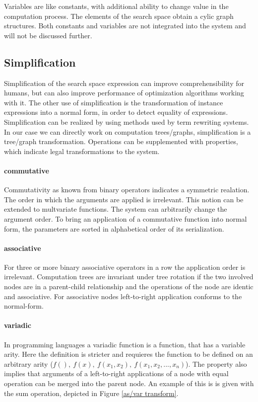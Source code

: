 \documentclass[english]{article}
\begin{document}
Variables are like constants, with additional ability to change value in the computation process. The elements of the search space obtain a cylic graph structures.
Both constants and variables are not integrated into the system and will not be discussed further.

\subsection{Simplification}
Simplification of the search space expression can improve comprehensibility for humans, but can also improve performance of optimization algorithms working with it. The other use of simplification is the transformation of instance expressions into a normal form, in order to detect equality of expressions.
Simplification can be realized by using methods used by term rewriting systems. In our case we can directly work on computation trees/graphs,  simplification is a tree/graph transformation. Operations can be supplemented with properties, which indicate legal transformations to the system.

\paragraph{commutative} Commutativity as known from binary operators indicates a symmetric realation. The order in which the arguments are applied is irrelevant. This notion can be extended to multvariate functions. The system can arbitrarily change the argument order. To bring an application of a commutative function into normal form, the parameters are sorted in alphabetical order of its serialization.

\paragraph{associative} For three or more binary associative operators in a row the application order is irrelevant. Computation trees are invariant under tree rotation if the two involved nodes are in a parent-child relationship and the operations of the node are identic and associative. For associative nodes left-to-right application conforms to the normal-form.

\paragraph{variadic}
In programming languages a variadic function is a function, that has a variable arity. Here the definition is stricter and requieres the function to be defined on an arbitrary arity ($f(),\ f(x),\ f(x_1,x_2),\ f(x_1,x_2,...,x_n)$).  The property also implies that arguments of a left-to-right applications of a node with equal operation can be merged into the parent node. An example of this is is given with the sum operation, depicted in Figure \ref{as/var transform}.
\end{document}
